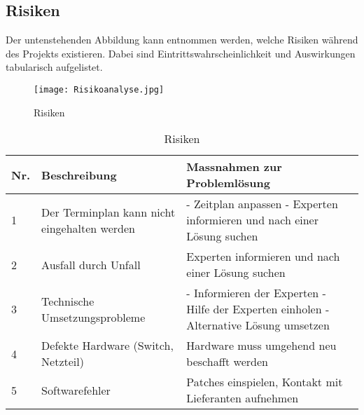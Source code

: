 
\subsection{Risiken}
Der untenstehenden Abbildung kann entnommen werden, welche Risiken während des Projekts existieren. Dabei sind  Eintrittswahrscheinlichkeit und Auswirkungen tabularisch aufgelistet.
\begin{figure}[htb]
\centering
\texttt{[image: Risikoanalyse.jpg]}
\caption{Risiken}
\label{fig:Risk}
\end{figure} 

\begin{table}[H]
\centering
\begin{tabular}{p{1cm}p{6cm}p{9cm}}
\hline
\rowcolor{heading} \textbf{Nr.} & \textbf{Beschreibung} & \textbf{Massnahmen zur Problemlösung} \\\hline
1 & Der Terminplan kann nicht eingehalten werden & - Zeitplan anpassen \newline - Experten informieren und nach einer Lösung suchen \\\hline
2 & Ausfall durch Unfall & Experten informieren und nach einer Lösung suchen  \\\hline
3 & Technische Umsetzungsprobleme & - Informieren der Experten \newline - Hilfe der Experten einholen \newline - Alternative Lösung umsetzen \\\hline
4 & Defekte Hardware (Switch, Netzteil) & Hardware muss umgehend neu beschafft werden  \\\hline
5 & Softwarefehler & Patches einspielen, Kontakt mit Lieferanten aufnehmen  \\\hline
\end{tabular}
\caption{Risiken}
\end{table}


